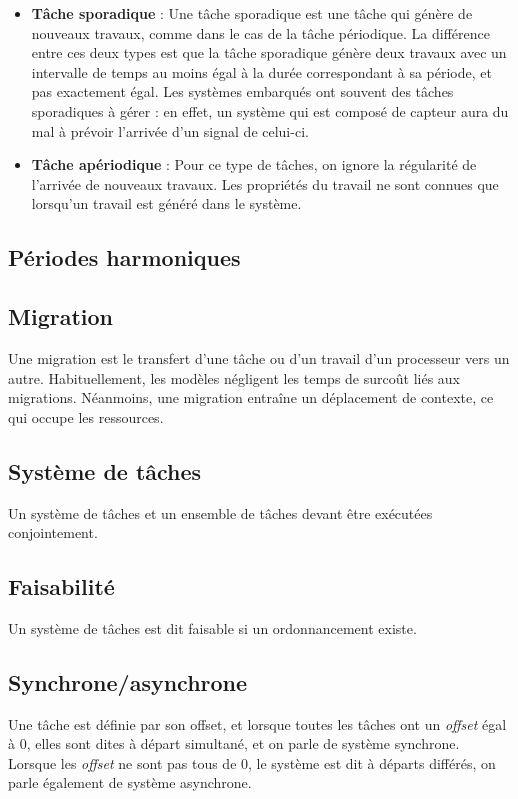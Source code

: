 \begin{itemize}
		\item \textbf{Tâche sporadique} : Une tâche sporadique est une tâche qui génère de nouveaux travaux, 
		comme dans le cas de la tâche périodique. 
		La différence entre ces deux types est que la tâche sporadique 
		génère deux travaux avec un intervalle de temps au moins égal à la durée correspondant à sa période, 
		et pas exactement égal. Les systèmes embarqués ont souvent des tâches sporadiques à gérer : 
		en effet, un système qui est composé de capteur aura du mal à prévoir l'arrivée d'un signal de 
		celui-ci. 
		
		\item \textbf{Tâche apériodique} : Pour ce type de tâches, on ignore la régularité de 
		l'arrivée de nouveaux travaux. Les propriétés du travail ne sont connues que lorsqu'un travail est 
		généré dans le système.
		
	\end{itemize}

	\subsection{Périodes harmoniques}\label{harmonique}

	
	\subsection{Migration}\label{migration}
	Une migration est le transfert d'une tâche ou d'un travail d’un processeur vers un autre. 
	Habituellement, les modèles négligent les temps de surcoût liés aux migrations. 
	Néanmoins, une migration entraîne un déplacement de contexte, ce qui occupe les 
	ressources. 
	
	\subsection{Système de tâches}
	Un système de tâches et un ensemble de tâches devant être exécutées conjointement. 
	
	\subsection{Faisabilité}
	Un système de tâches est dit faisable si un ordonnancement existe.
	
	\subsection{Synchrone/asynchrone}
	Une tâche est définie par son offset, et lorsque toutes les tâches ont un \textit{offset} égal à 0, 
	elles sont dites \og à départ simultané\fg, et on parle de système synchrone. 
	Lorsque les \textit{offset} ne sont pas tous de 0, le système est dit à départs \og différés\fg{}, 
	on parle également de système asynchrone.
	
